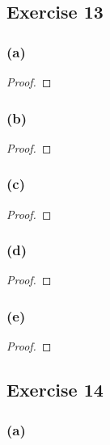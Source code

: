 \documentclass[14pt]{extarticle}
\begin{document}
\subsection{Exercise 13}

\subsubsection{(a)}

\begin{proof}

\end{proof}

\subsubsection{(b)}

\begin{proof}

\end{proof}

\subsubsection{(c)}

\begin{proof}

\end{proof}

\subsubsection{(d)}

\begin{proof}

\end{proof}

\subsubsection{(e)}

\begin{proof}

\end{proof}

\subsection{Exercise 14}

\subsubsection{(a)}
\end{document}
